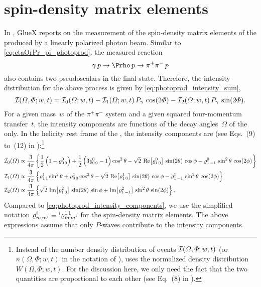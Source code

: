 \section{\Prho spin-density matrix elements}%
\label{sec:rho_sdme}

In , GlueX reports on the measurement of the
spin-density matrix elements of the \Prho produced by a linearly
polarized photon beam.  Similar to \cref{eq:etaOrPr_pi_photoprod}, the
measured reaction
\begin{equation}
  \label{eq:rho_photoprod}
  \gamma\, p \to \Prho\, p \to \pi^+ \pi^-\, p
\end{equation}
also contains two pseudoscalars in the final state.  Therefore, the
intensity distribution for the above process is given by
\cref{eq:photoprod_intensity_sum}, \ie
\begin{equation}
  \label{eq:photoprod_intensity_sum2}
  \mathcal{I}(\Omega, \Phi; w, t)
  = \mathcal{I}_0(\Omega; w, t)
  - \mathcal{I}_1(\Omega; w, t)\, P_\gamma\, \cos(2 \Phi)
  - \mathcal{I}_2(\Omega; w, t)\, P_\gamma\, \sin(2 \Phi).
\end{equation}
For a given mass~$w$ of the $\pi^+ \pi^-$ system and a given squared
four-momentum transfer~$t$, the intensity components are functions of
the decay angles~$\Omega$ of the \Prho only.  In the helicity rest
frame of the \Prho, the intensity components are (see Eqs.~(9) to~(12)
in ):\footnote{Instead of the number density
distribution of events $\mathcal{I}(\Omega, \Phi; w, t)$ (or $n(\Omega,
\Phi; w, t)$ in the notation of ),
 uses the normalized density distribution
$W(\Omega, \Phi; w, t)$.  For the discussion here, we only need the
fact that the two quantities are proportional to each other (see
Eq.~(8) in ).}
\begin{align}
  \label{eq:intensity_0_rho_photoprod}
  \intensity_0(\Omega)
  \propto{}& \frac{3}{4 \pi} \cBrk{\frac{1}{2} \rBrk{1 - \varrho^0_{0\, 0}} + \frac{1}{2} \rBrk{3 \varrho^0_{0\, 0} - 1} \cos^2 \theta
  - \sqrt{2}\, \Re[1]{\varrho^0_{1\, 0}}\, \sin(2 \theta)\, \cos \phi - \varrho^0_{1\, {-1}}\, \sin^2 \theta\, \cos(2 \phi)} \\
  \label{eq:intensity_1_rho_photoprod}
  \intensity_1(\Omega)
  \propto{}& \frac{3}{4 \pi} \cBrk{\varrho^1_{1\, 1} \sin^2 \theta + \varrho^1_{0\, 0} \cos^2 \theta
  - \sqrt{2}\, \Re[1]{\varrho^1_{1\, 0}}\, \sin(2 \theta)\, \cos \phi - \varrho^1_{1\, {-1}}\, \sin^2 \theta\, \cos(2 \phi)} \\
  \label{eq:intensity_2_rho_photoprod}
  \intensity_2(\Omega)
  \propto{}& \frac{3}{4 \pi} \cBrk{\sqrt{2}\, \Im[1]{\varrho^2_{1\, 0}}\, \sin(2 \theta)\, \sin \phi
  + \Im[1]{\varrho^2_{1\, {-1}}}\, \sin^2 \theta\, \sin(2 \phi)}.
\end{align}
Compared to \cref{eq:photoprod_intensity_components}, we use the
simplified notation $\varrho^i_{m\, m'} \equiv
\prescript{i}{}{\varrho}^{1\, 1}_{m\, m'}$ for the spin-density matrix
elements.  The above expressions assume that only $P$-waves contribute
to the intensity components.


